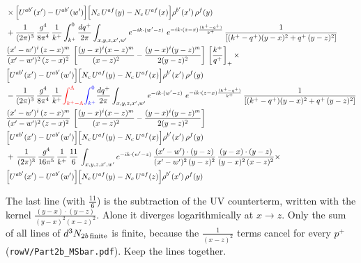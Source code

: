 \documentclass[10pt]{article}
\numberwithin{equation}{section}
\begin{document}
\begin{align}
&\times\Big[U^{ab'}(x')-U^{ab'}(w')\Big]\Big[N_{c}\,U^{af}(y)-N_{c}\,U^{af}(x)\Big]\rho^{b'}(x')\,\rho^{f}(y)\notag \\ & + \frac{1}{(2\pi)^{3}}\,\frac{g^{4}}{8\pi^{4}}\,\frac{1}{k^{+}}\int_{k^{+}}^{0}\frac{dq^{+}}{2\pi}\int_{x,y,z,x',w'}e^{-ik\cdot(w'-z)}\ e^{-ik\cdot(z-x)\frac{(k^{+}-q^{+})}{k^{+}}}\,\frac{1}{\left[(k^{+}-q^{+})(y-x)^{2}+q^{+}\,(y-z)^{2}\right]}\notag \\ & \frac{(x'-w')^{i}\,(z-x)^{m}}{(x'-w')^{2}\,(z-x)^{2}}\,\left[\frac{(y-x)^{i}(x-z)^{m}}{(x-z)^{2}}-\frac{(y-x)^{i}(y-z)^{m}}{2(y-z)^{2}}\right]\,\left[\frac{k^{+}}{q^{+}}\right]_{+}\times\notag \\ & \Big[U^{ab'}(x')-U^{ab'}(w')\Big]\Big[N_{c}\,U^{af}(y)-N_{c}\,U^{af}(x)\Big]\rho^{b'}(x')\,\rho^{f}(y)\notag \\ & - \frac{1}{(2\pi)^{3}}\,\frac{g^{4}}{8\pi^{4}}\,\frac{1}{k^{+}}{\color{red}\int_{k^{+}-\Lambda}^{\Lambda}}{\color{blue}\int_{k^{+}}^{0}}\frac{dq^{+}}{2\pi}\int_{x,y,z,x',w'}e^{-ik\cdot(w'-z)}\ e^{-ik\cdot(z-x)\frac{(k^{+}-q^{+})}{k^{+}}}\,\frac{1}{\left[(k^{+}-q^{+})(y-x)^{2}+q^{+}\,(y-z)^{2}\right]}\notag \\ & \frac{(x'-w')^{i}\,(z-x)^{m}}{(x'-w')^{2}\,(z-x)^{2}}\,\left[\frac{(y-x)^{i}(x-z)^{m}}{(x-z)^{2}}-\frac{(y-x)^{i}(y-z)^{m}}{2(y-z)^{2}}\right]\notag \\ & \Big[U^{ab'}(x')-U^{ab'}(w')\Big]\Big[N_{c}\,U^{af}(y)-N_{c}\,U^{af}(x)\Big]\rho^{b'}(x')\,\rho^{f}(y)\notag \\ & +\, \frac{1}{(2\pi)^{3}}\,\frac{g^{4}}{16\pi^{5}}\,\frac{1}{k^{+}}\,\frac{11}{6}\,\int_{x,y,z,x',w'}e^{-ik\cdot(w'-z)}\, \frac{(x'-w')\cdot(y-z)}{(x'-w')^{2}\,(y-z)^{2}}\,\frac{(y-x)\cdot(y-z)}{(y-x)^{2}\,(x-z)^{2}}\times\notag \\ & \Big[U^{ab'}(x')-U^{ab'}(w')\Big]\Big[N_{c}\,U^{af}(y)-N_{c}\,U^{af}(z)\Big]\rho^{b'}(x')\,\rho^{f}(y)
\end{align}

The last line (with $\frac{11}{6}$) is the subtraction of the UV counterterm, written with the kernel $\frac{(y-x)\cdot(y-z)}{(y-x)^2(x-z)^2}$. Alone it diverges logarithmically at $x\to z$. Only the sum of all lines of $d^3N_{2b\,\rm finite}$ is finite, because the $\frac{1}{(x-z)^2}$ terms cancel for every $p^+$ (\texttt{rowV/Part2b\_MSbar.pdf}). Keep the lines together.
\end{document}
